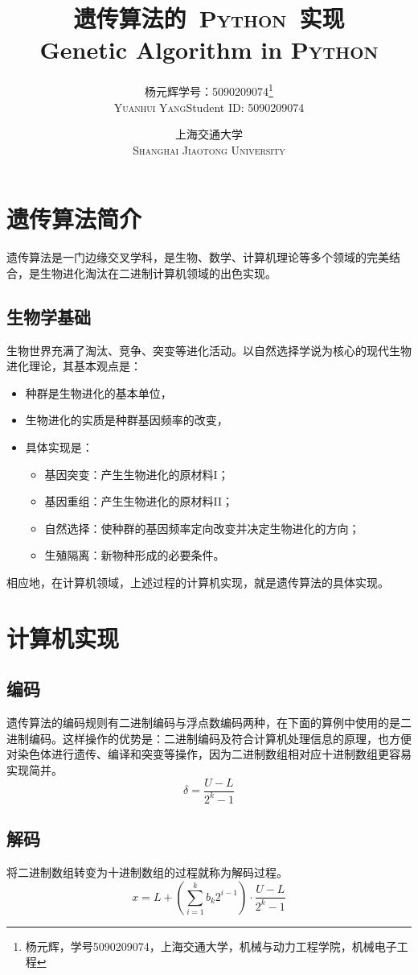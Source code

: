 \documentclass[12pt]{article}
\title{遗传算法的~\textsc{Python}~实现\\
Genetic Algorithm in \textsc{Python}}
\author{\kaishu{}杨元辉\quad 学号：5090209074\thanks{杨元辉，学号5090209074，上海交通大学，机械与动力工程学院，机械电子工程}\\
\textsc{Yuanhui Yang}\quad Student ID: 5090209074}
\date{\kaishu{}上海交通大学\\\textsc{Shanghai Jiaotong University}}
\begin{document}
\cfoot{}
\rfoot{\thepage}
\maketitle
\thispagestyle{fancy}
\section{遗传算法简介}
遗传算法是一门边缘交叉学科，是生物、数学、计算机理论等多个领域的完美结合，是生物进化淘汰在二进制计算机领域的出色实现。
\subsection{生物学基础}
生物世界充满了淘汰、竞争、突变等进化活动。以自然选择学说为核心的现代生物进化理论，其基本观点是：
\begin{itemize}
\item 种群是生物进化的基本单位，
\item 生物进化的实质是种群基因频率的改变，
\item 具体实现是：
\begin{itemize}
\item 基因突变：产生生物进化的原材料I；
\item 基因重组：产生生物进化的原材料II；
\item 自然选择：使种群的基因频率定向改变并决定生物进化的方向；
\item 生殖隔离：新物种形成的必要条件。
\end{itemize}
\end{itemize}\par
相应地，在计算机领域，上述过程的计算机实现，就是遗传算法的具体实现。
\section{计算机实现}
\subsection{编码}
遗传算法的编码规则有二进制编码与浮点数编码两种，在下面的算例中使用的是二进制编码。这样操作的优势是：二进制编码及符合计算机处理信息的原理，也方便对染色体进行遗传、编译和突变等操作，因为二进制数组相对应十进制数组更容易实现简并。
\begin{equation}
\delta =  \dfrac{U - L}{2^k - 1}
\end{equation}
\subsection{解码}
将二进制数组转变为十进制数组的过程就称为解码过程。
\begin{equation}
x = L + \left(\sum\limits_{i = 1}^{k}{b_k 2^{i-1}}\right)\cdot \dfrac{U-L}{2^k - 1} 
\end{equation}
\end{document}
